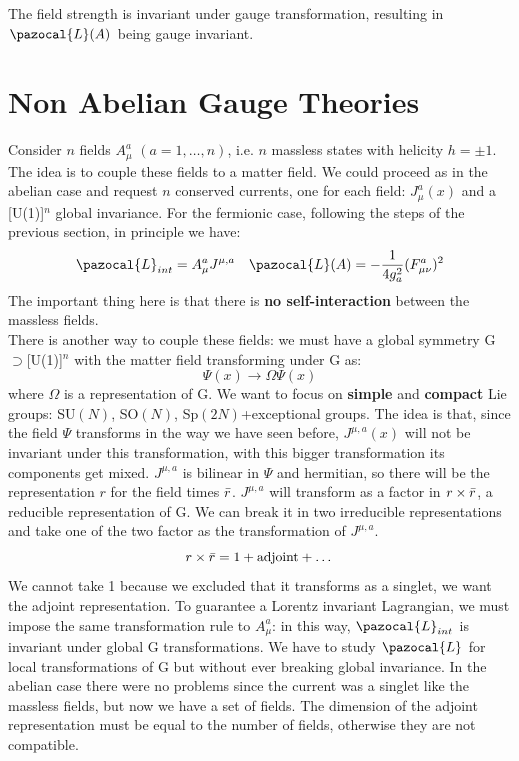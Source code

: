 \documentclass[../main.tex]{subfiles}
\begin{document}
The field strength is invariant under gauge transformation, resulting in $\pazocal{L}(A)$ being gauge invariant. 
\section{Non Abelian Gauge Theories}
Consider $n$ fields $A_\mu^a$ $(a=1,\dots,n)$, i.e. $n$ massless states with helicity $h=\pm1$. The idea is to couple these fields to a matter field. We could proceed as in the abelian case and request $n$ conserved currents, one for each field: $J_\mu^a(x)$ and a [U(1)]$^n$ global invariance. For the fermionic case, following the steps of the previous section, in principle we have:
\[
\pazocal{L}_{int}=A_\mu^a J^{\mu,a} \quad \pazocal{L}(A)=-\frac{1}{4g_a^2}(F_{\mu\nu}^a)^2
\]
The important thing here is that there is \textbf{no self-interaction} between the massless fields.\\
There is another way to couple these fields: we must have a global symmetry G$\supset$[U(1)]$^n$ with the matter field transforming under G as:
\[
\Psi(x)\to\Omega\Psi(x)
\]
where $\Omega$ is a representation of G. We want to focus on \textbf{simple} and \textbf{compact} Lie groups: SU$(N)$, SO$(N)$, Sp$(2N)$+exceptional groups. The idea is that, since the field $\Psi$ transforms in the way we have seen before, $J^{\mu,a}(x)$ will not be invariant under this transformation, with this bigger transformation its components get mixed. $J^{\mu,a}$ is bilinear in $\Psi$ and hermitian, so there will be the representation $r$ for the field times $\Bar{r}$. $J^{\mu,a}$ will transform as a factor in $r\times\Bar{r}$, a reducible representation of G. We can break it in two irreducible representations and take one of the two factor as the transformation of $J^{\mu,a}$.
\[
r\times\Bar{r}=1+\text{adjoint}+\dots
\]
We cannot take 1 because we excluded that it transforms as a singlet, we want the adjoint representation. To guarantee a Lorentz invariant Lagrangian, we must impose the same transformation rule to $A_\mu^a$: in this way, $\pazocal{L}_{int}$ is invariant under global G transformations. We have to study $\pazocal{L}$ for local transformations of G but without ever breaking global invariance. In the abelian case there were no problems since the current was a singlet like the massless fields, but now we have a set of fields. The dimension of the adjoint representation must be equal to the number of fields, otherwise they are not compatible.
\end{document}
